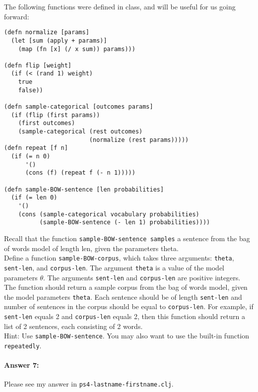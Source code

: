 \documentclass[10pt]{article}
\newcommand{\PSnum}{4}
\begin{document}
\noindent The following functions were defined in class, and will be
useful for us going forward:

\begin{lstlisting}
(defn normalize [params]
  (let [sum (apply + params)]
    (map (fn [x] (/ x sum)) params)))

(defn flip [weight]
  (if (< (rand 1) weight)
    true
    false))

(defn sample-categorical [outcomes params]
  (if (flip (first params))
    (first outcomes)
    (sample-categorical (rest outcomes) 
                        (normalize (rest params)))))
(defn repeat [f n]
  (if (= n 0)
      '()
      (cons (f) (repeat f (- n 1)))))

(defn sample-BOW-sentence [len probabilities]
  (if (= len 0)
    '()
    (cons (sample-categorical vocabulary probabilities)
          (sample-BOW-sentence (- len 1) probabilities))))
\end{lstlisting}

\noindent Recall that the function \texttt{sample-BOW-sentence
  samples} a sentence from the bag of words model of length len, given
the parameters theta.
\\

\noindent Define a function \texttt{sample-BOW-corpus}, which takes
three arguments: \texttt{theta}, \texttt{sent-len}, and
\texttt{corpus-len}. The argument \texttt{theta} is a value of the
model parameters $\theta$. The arguments \texttt{sent-len} and
\texttt{corpus-len} are positive integers. The function should return
a sample corpus from the bag of words model, given the model
parameters \texttt{theta}. Each sentence should be of length
\texttt{sent-len} and number of sentences in the corpus should be
equal to \texttt{corpus-len}. For example, if \texttt{sent-len} equals
2 and \texttt{corpus-len} equals 2, then this function should return a
list of 2 sentences, each consisting of 2 words.
\\

\noindent Hint: Use \texttt{sample-BOW-sentence}. You may also want to use the built-in function \texttt{repeatedly}.

\paragraph{Answer 7:} Please see my answer in
\texttt{ps\PSnum-lastname-firstname.clj}.

\noindent\hrulefill %
\end{document}
